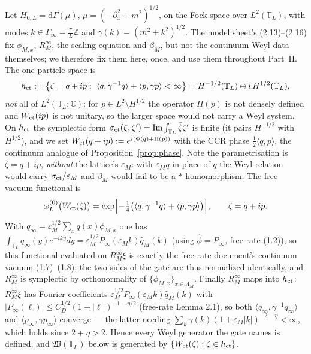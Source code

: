\documentclass[11pt,a4paper]{article}
\theoremstyle{plain}
\theoremstyle{definition}
\newcommand{\Z}{\mathbb{Z}}
\newcommand{\C}{\mathbb{C}}
\newcommand{\T}{\mathbb{T}}
\newcommand{\eps}{\varepsilon}
\newcommand{\ip}[2]{\langle #1,#2\rangle}
\begin{document}
Let $H_{0,L}=\mathrm d\Gamma(\mu)$, $\mu=(-\partial_x^2+m^2)^{1/2}$, on the
Fock space over $L^2(\T_L)$, with modes $k\in\Gamma_\infty=\tfrac\pi L\Z$ and
$\gamma(k)=(m^2+k^2)^{1/2}$. The model sheet's (2.13)--(2.16) fix
$\phi_{M,x}$, $R_M^\infty$, the scaling equation and $\beta_M$, but not the
continuum Weyl data themselves; we therefore fix them here, once, and use them
throughout Part~II. The one-particle space is
\[
 h_{\rm ct}:=\bigl\{\zeta=q+ip:\ \ip{q}{\gamma^{-1}q}+\ip{p}{\gamma p}<\infty\bigr\}
 =H^{-1/2}(\T_L)\oplus i\,H^{1/2}(\T_L),
\]
\emph{not} all of $L^2(\T_L;\C)$: for $p\in L^2\setminus H^{1/2}$ the operator
$\Pi(p)$ is not densely defined and $W_{\rm ct}(ip)$ is not unitary, so the larger
space would not carry a Weyl system. On $h_{\rm ct}$ the symplectic form
$\sigma_{\rm ct}(\zeta,\zeta')=\mathrm{Im}\int_{\T_L}\bar\zeta\zeta'$ is finite (it
pairs $H^{-1/2}$ with $H^{1/2}$), and we set
$W_{\rm ct}(q+ip):=e^{i(\Phi(q)+\Pi(p))}$ with the CCR phase
$\tfrac12\ip{q}{p}$, the continuum analogue of Proposition~\ref{prop:phase}. Note the
parametrisation is $\zeta=q+ip$, \emph{without} the lattice's $\eps_M$: with
$\eps_Mq$ in place of $q$ the Weyl relation would carry $\sigma_{\rm ct}/\eps_M$ and
$\beta_M$ would fail to be a $*$-homomorphism. The free vacuum
functional is
\[
 \omega^{(0)}_L\bigl(W_{\rm ct}(\zeta)\bigr)
 =\exp\Bigl[-\tfrac14\bigl(\ip{q}{\gamma^{-1}q}+\ip{p}{\gamma p}\bigr)\Bigr],
 \qquad\zeta=q+ip .
\]
With $q_\infty=\eps_M^{1/2}\sum_xq(x)\phi_{M,x}$ one has
$\int_{\T_L}q_\infty(y)e^{-iky}dy=\eps_M^{1/2}P_\infty(\eps_Mk)\widehat q_M(k)$
(using $\widehat\phi=P_\infty$, free-rate (1.2)), so this functional evaluated on
$R_M^\infty\xi$ is exactly the free-rate document's continuum vacuum
(1.7)--(1.8); the two sides of the gate are thus normalized identically, and
$R_M^\infty$ is symplectic by orthonormality of
$\{\phi_{M,x}\}_{x\in\Lambda_M}$. Finally $R_M^\infty$ maps into $h_{\rm ct}$:
$R_M^\infty\xi$ has Fourier coefficients $\eps_M^{1/2}P_\infty(\eps_Mk)\widehat q_M(k)$
with $|P_\infty(\ell)|\le C_D^{1/2}(1+|\ell|)^{-1-\eta/2}$ (free-rate Lemma 2.1), so
both $\ip{q_\infty}{\gamma^{-1}q_\infty}$ and $\ip{p_\infty}{\gamma p_\infty}$ converge
--- the latter needing $\sum_k\gamma(k)(1+\eps_M|k|)^{-2-\eta}<\infty$, which holds
since $2+\eta>2$. Hence every Weyl generator the gate names is defined, and
$\mathfrak W(\T_L)$ below is generated by $\{W_{\rm ct}(\zeta):\zeta\in h_{\rm ct}\}$.
\end{document}
